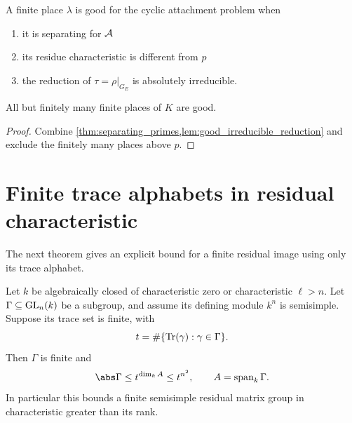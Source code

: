 \begin{definition}\label{def:good_separating_prime}
A finite place \(\lambda\) is good for the cyclic attachment problem when

\begin{enumerate}
\item it is separating for \(\mathcal A\)
\item its residue characteristic is different from \(p\)
\item the reduction of \(\tau=\rho|_{G_E}\) is absolutely irreducible.
\end{enumerate}
\end{definition}

\begin{corollary}\label{cor:abundant_good_primes}
All but finitely many finite places of \(K\) are good.
\end{corollary}

\begin{proof}
Combine \cref{thm:separating_primes,lem:good_irreducible_reduction} and exclude the finitely many places above \(p\).
\end{proof}

\section{Finite trace alphabets in residual characteristic}\label{sec:finite_trace_bound}

The next theorem gives an explicit bound for a finite residual image using only its trace alphabet.

\begin{theorem}\label{thm:finite_trace_image_bound}
Let \(k\) be algebraically closed of characteristic zero or characteristic \(\ell>n\). Let \(\Gamma\subseteq\operatorname{GL}_n(k)\) be a subgroup, and assume its defining module \(k^n\) is semisimple. Suppose its trace set is finite, with
\[
 t=\#\{\operatorname{Tr}(\gamma):\gamma\in\Gamma\}.
\]
Then \(\Gamma\) is finite and
\[
 \abs\Gamma\le t^{\dim_k A}\le t^{n^2},
 \qquad A=\operatorname{span}_k\Gamma.
\]
In particular this bounds a finite semisimple residual matrix group in characteristic greater than its rank.
\end{theorem}

